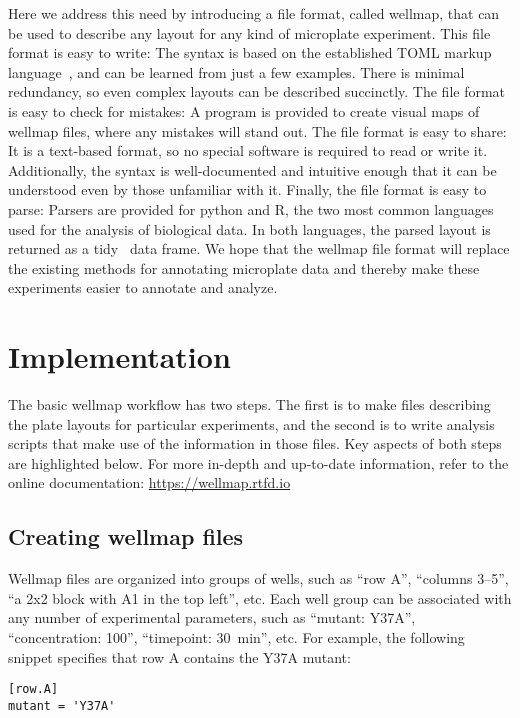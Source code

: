 \documentclass{bmcart}
\begin{document}
Here we address this need by introducing a file format, called wellmap, that
can be used to describe any layout for any kind of microplate experiment. This
file format is easy to write: The syntax is based on the established TOML
markup language~\cite{preston-werner2020}, and can be learned from just a few
examples. There is minimal redundancy, so even complex layouts can be described
succinctly. The file format is easy to check for mistakes: A program is
provided to create visual maps of wellmap files, where any mistakes will stand
out. The file format is easy to share: It is a text-based format, so no special
software is required to read or write it. Additionally, the syntax is
well-documented and intuitive enough that it can be understood even by those
unfamiliar with it. Finally, the file format is easy to parse: Parsers are
provided for python and R, the two most common languages used for the analysis
of biological data. In both languages, the parsed layout is returned as a
tidy~\cite{wickham2014} data frame. We hope that the wellmap file format will
replace the existing methods for annotating microplate data and thereby make
these experiments easier to annotate and analyze.

\section*{Implementation}

The basic wellmap workflow has two steps. The first is to make files describing
the plate layouts for particular experiments, and the second is to write
analysis scripts that make use of the information in those files. Key aspects
of both steps are highlighted below. For more in-depth and up-to-date
information, refer to the online documentation: \url{https://wellmap.rtfd.io} 

\subsection*{Creating wellmap files}

Wellmap files are organized into groups of wells, such as ``row A'', ``columns
3--5'', ``a 2x2 block with A1 in the top left'', etc.  Each well group can be
associated with any number of experimental parameters, such as ``mutant:
Y37A'', ``concentration: \SI{100}{\ugmL}'', ``timepoint: \SI{30}{\minute}'',
etc.  For example, the following snippet specifies that row A contains the Y37A
mutant:

\begin{lstlisting}
[row.A]
mutant = 'Y37A'
\end{lstlisting}
\end{document}
